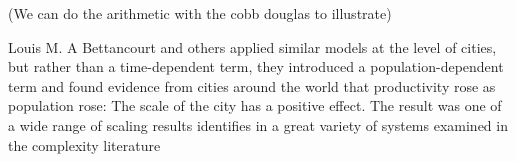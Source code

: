 (We can do the arithmetic with the cobb douglas to illustrate)

Louis M. A Bettancourt and others applied similar models at the level of cities, but rather than a time-dependent term, they introduced a population-dependent term and found evidence from cities around the world that productivity rose as population rose: The scale of the city has a positive effect. The result  was one of a wide range of scaling results identifies in a great variety of systems examined in the complexity literature 



